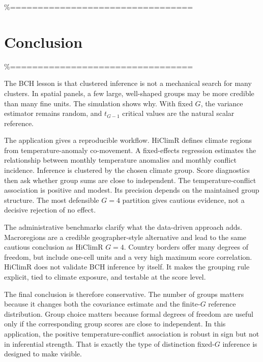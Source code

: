 \documentclass[
]{article}
\begin{document}
\%=================================

\section{Conclusion}

\%=================================

The BCH lesson is that clustered inference is not a mechanical search
for many clusters. In spatial panels, a few large, well-shaped groups
may be more credible than many fine units. The simulation shows why.
With fixed \(G\), the variance estimator remains random, and \(t_{G-1}\)
critical values are the natural scalar reference.

The application gives a reproducible workflow. HiClimR defines climate
regions from temperature-anomaly co-movement. A fixed-effects regression
estimates the relationship between monthly temperature anomalies and
monthly conflict incidence. Inference is clustered by the chosen climate
group. Score diagnostics then ask whether group sums are close to
independent. The temperature-conflict association is positive and
modest. Its precision depends on the maintained group structure. The
most defensible \(G=4\) partition gives cautious evidence, not a
decisive rejection of no effect.

The administrative benchmarks clarify what the data-driven approach
adds. Macroregions are a credible geographer-style alternative and lead
to the same cautious conclusion as HiClimR \(G=4\). Country borders
offer many degrees of freedom, but include one-cell units and a very
high maximum score correlation. HiClimR does not validate BCH inference
by itself. It makes the grouping rule explicit, tied to climate
exposure, and testable at the score level.

The final conclusion is therefore conservative. The number of groups
matters because it changes both the covariance estimate and the
finite-\(G\) reference distribution. Group choice matters because formal
degrees of freedom are useful only if the corresponding group scores are
close to independent. In this application, the positive
temperature-conflict association is robust in sign but not in
inferential strength. That is exactly the type of distinction
fixed-\(G\) inference is designed to make visible.


\end{document}
